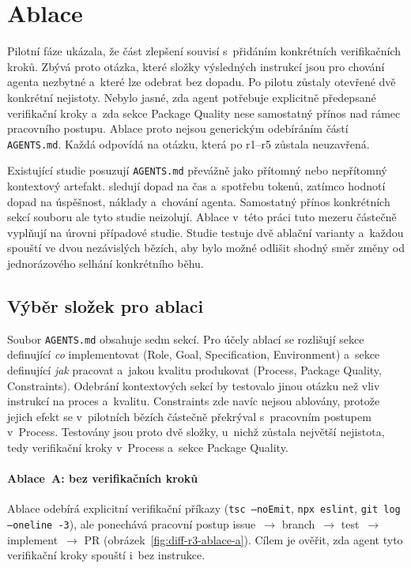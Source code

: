\section{Ablace}
\label{sec:komparativni-vysledky}

Pilotní fáze ukázala, že část zlepšení souvisí s~přidáním
konkrétních verifikačních kroků. Zbývá proto otázka, které složky
výsledných instrukcí jsou pro chování agenta nezbytné a~které lze
odebrat bez dopadu. Po pilotu zůstaly otevřené dvě konkrétní
nejistoty. Nebylo jasné, zda agent potřebuje explicitně předepsané verifikační kroky
a~zda sekce Package Quality nese samostatný přínos nad rámec pracovního postupu.
Ablace proto nejsou generickým odebíráním částí \texttt{AGENTS.md}.
Každá odpovídá na otázku, která po r1--r5 zůstala neuzavřená.

Existující studie posuzují \texttt{AGENTS.md} převážně jako přítomný
nebo nepřítomný kontextový artefakt. \textcite{lulla2026} sledují
dopad na čas a~spotřebu tokenů, zatímco
\textcite{gloaguen2025agentsmd} hodnotí dopad na úspěšnost,
náklady a~chování agenta. Samostatný přínos konkrétních sekcí
souboru ale tyto studie neizolují. Ablace v~této práci tuto mezeru
částečně vyplňují na úrovni případové studie.
Studie testuje dvě ablační varianty a~každou spouští ve dvou nezávislých
bězích, aby bylo možné odlišit shodný směr změny od jednorázového
selhání konkrétního běhu.

\subsection{Výběr složek pro ablaci}
\label{sec:vyber-ablaci}

Soubor \texttt{AGENTS.md} obsahuje sedm sekcí. Pro účely ablací
se rozlišují sekce definující \textit{co} implementovat
(Role, Goal, Specification, Environment) a~sekce definující
\textit{jak} pracovat a~jakou kvalitu produkovat
(Process, Package Quality, Constraints). Odebrání kontextových sekcí
by testovalo jinou otázku než vliv instrukcí na proces a~kvalitu.
Constraints zde navíc nejsou ablovány, protože jejich efekt se v~pilotních
bězích částečně překrýval s~pracovním postupem v~Process. Testovány
jsou proto dvě složky, u~nichž zůstala největší nejistota, tedy
verifikační kroky v~Process a~sekce Package Quality.

\paragraph{Ablace~A: bez verifikačních kroků}
Ablace odebírá explicitní verifikační příkazy
(\texttt{tsc --noEmit}, \texttt{npx eslint},
\texttt{git log --oneline -3}), ale ponechává pracovní postup
issue~$\to$ branch~$\to$ test~$\to$ implement~$\to$ PR
(obrázek~\ref{fig:diff-r3-ablace-a}). Cílem je ověřit, zda agent tyto
verifikační kroky spouští i~bez instrukce.

